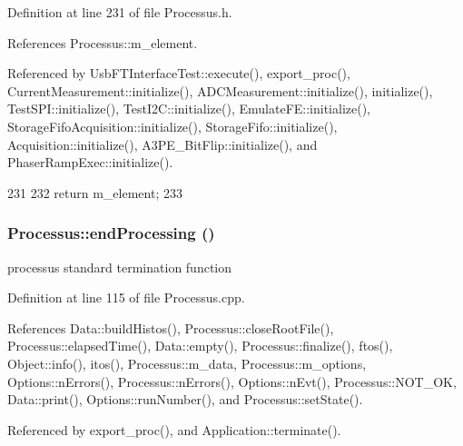 Definition at line 231 of file Processus.h.

References Processus::m\_\-element.

Referenced by UsbFTInterfaceTest::execute(), export\_\-proc(), CurrentMeasurement::initialize(), ADCMeasurement::initialize(), initialize(), TestSPI::initialize(), TestI2C::initialize(), EmulateFE::initialize(), StorageFifoAcquisition::initialize(), StorageFifo::initialize(), Acquisition::initialize(), A3PE\_\-BitFlip::initialize(), and PhaserRampExec::initialize().


\begin{DoxyCode}
231                       {
232     return m_element;
233   }
\end{DoxyCode}
\hypertarget{classProcessus_a5e4da662989d356b89d490b89c7afbfd}{
\subsubsection[{endProcessing}]{ Processus::endProcessing ()}}
\label{classProcessus_a5e4da662989d356b89d490b89c7afbfd}
processus standard termination function 

Definition at line 115 of file Processus.cpp.

References Data::buildHistos(), Processus::closeRootFile(), Processus::elapsedTime(), Data::empty(), Processus::finalize(), ftos(), Object::info(), itos(), Processus::m\_\-data, Processus::m\_\-options, Options::nErrors(), Processus::nErrors(), Options::nEvt(), Processus::NOT\_\-OK, Data::print(), Options::runNumber(), and Processus::setState().

Referenced by export\_\-proc(), and Application::terminate().


